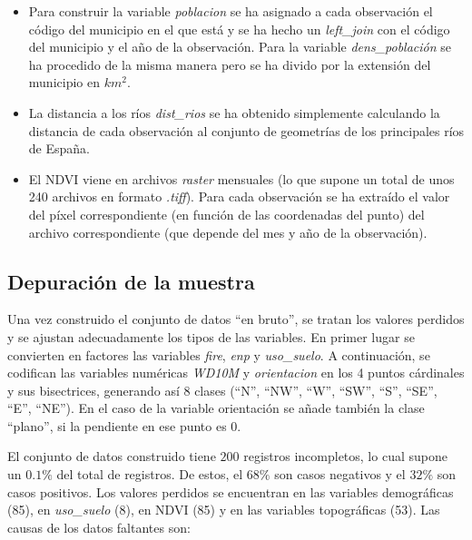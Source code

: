 \documentclass[12pt,a4paper,]{book}
\numberwithin{dummy}{section}
\theoremstyle{ocrenumbox}
\theoremstyle{blacknumex}
\theoremstyle{blacknumbox}
\theoremstyle{ocrenum}
\theoremstyle{ocrenum}
\begin{document}
\begin{itemize}
\item
  Para construir la variable \emph{poblacion} se ha asignado a cada
  observación el código del municipio en el que está y se ha hecho un
  \emph{left\_join} con el código del municipio y el año de la
  observación. Para la variable \emph{dens\_población} se ha procedido
  de la misma manera pero se ha divido por la extensión del municipio en
  \(km^2\).
\item
  La distancia a los ríos \emph{dist\_rios} se ha obtenido simplemente
  calculando la distancia de cada observación al conjunto de geometrías
  de los principales ríos de España.
\item
  El NDVI viene en archivos \emph{raster} mensuales (lo que supone un
  total de unos 240 archivos en formato \emph{.tiff}). Para cada
  observación se ha extraído el valor del píxel correspondiente (en
  función de las coordenadas del punto) del archivo correspondiente (que
  depende del mes y año de la observación).
\end{itemize}

\hypertarget{depuraciuxf3n-de-la-muestra}{%
\subsection{Depuración de la
muestra}\label{depuraciuxf3n-de-la-muestra}}

Una vez construido el conjunto de datos ``en bruto'', se tratan los
valores perdidos y se ajustan adecuadamente los tipos de las variables.
En primer lugar se convierten en factores las variables \emph{fire},
\emph{enp} y \emph{uso\_suelo}. A continuación, se codifican las
variables numéricas \emph{WD10M} y \emph{orientacion} en los 4 puntos
cárdinales y sus bisectrices, generando así 8 clases (``N'', ``NW'',
``W'', ``SW'', ``S'', ``SE'', ``E'', ``NE''). En el caso de la variable
orientación se añade también la clase ``plano'', si la pendiente en ese
punto es 0.

El conjunto de datos construido tiene \(200\) registros incompletos, lo
cual supone un \(0.1\%\) del total de registros. De estos, el \(68\%\)
son casos negativos y el \(32\%\) son casos positivos. Los valores
perdidos se encuentran en las variables demográficas (85), en
\emph{uso\_suelo} (8), en NDVI (85) y en las variables topográficas
(53). Las causas de los datos faltantes son:
\end{document}
